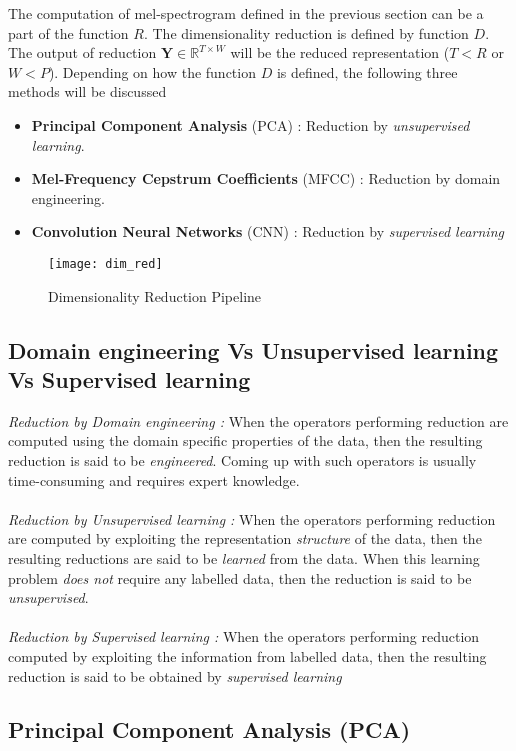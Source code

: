 \noindent The computation of mel-spectrogram defined in the previous section can be a part of the function $R$. The dimensionality reduction is defined by function $D$. The output of reduction $\textbf{Y} \in \mathbb{R}^{T \times W}$ will be the reduced representation ($T < R$ or $W < P$). Depending on how the function $D$ is defined, the following three methods will be discussed
\begin{itemize}
  \item \textbf{Principal Component Analysis} (PCA) : Reduction by \textit{unsupervised learning}.
  \item \textbf{Mel-Frequency Cepstrum Coefficients} (MFCC) : Reduction by domain engineering.
  \item \textbf{Convolution Neural Networks} (CNN) : Reduction by \textit{supervised learning}
\end{itemize} 
\begin{figure}[h] 
\centering
\texttt{[image: dim\_red]}
\caption{Dimensionality Reduction Pipeline}
 \label{fig:Dimensionality Reduction}
 \end{figure}
\FloatBarrier
\bigskip

\subsection{Domain engineering Vs Unsupervised learning Vs Supervised learning}
\textit{Reduction by Domain engineering :} When the operators performing reduction are computed using the domain specific properties of the data, then the resulting reduction is said to be \textit{engineered}. Coming up with such operators is usually time-consuming and requires expert knowledge.\\
\\
\textit{Reduction by Unsupervised learning :} When the operators performing reduction are computed by exploiting the representation \textit{structure} of the data, then the resulting reductions are said to be \textit{learned} from the data. When this learning problem \textit{does not} require any labelled data, then the reduction is said to be \textit{unsupervised}.\\
\\
\textit{Reduction by Supervised learning :} When the operators performing reduction computed by exploiting the information from labelled data, then the resulting reduction is said to be obtained by \textit{supervised learning} 

\subsection{Principal Component Analysis (PCA)}
\label{pca}

